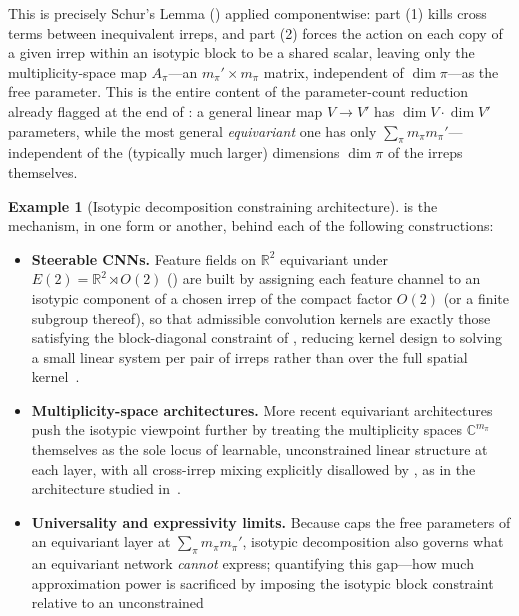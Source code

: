 \documentclass[11pt]{article}
\theoremstyle{plain}
\theoremstyle{definition}
\newtheorem{Example}{Example}[section]
\begin{document}
This is precisely Schur's Lemma () applied
componentwise: part (1) kills cross terms between inequivalent irreps, and
part (2) forces the action on each copy of a given irrep within an isotypic
block to be a shared scalar, leaving only the multiplicity-space map
$A_\pi$---an $m_\pi' \times m_\pi$ matrix, independent of $\dim \pi$---as the
free parameter. This is the entire content of the parameter-count reduction
already flagged at the end of : a general
linear map $V \to V'$ has $\dim V \cdot \dim V'$ parameters, while the most
general \emph{equivariant} one has only
$\sum_\pi m_\pi m_\pi'$---independent of the (typically much larger)
dimensions $\dim \pi$ of the irreps themselves.

\begin{Example}[Isotypic decomposition constraining architecture]
\label{ex:isotypic-architecture}
 is the mechanism, in one form or
another, behind each of the following constructions:
\begin{itemize}
    \item \textbf{Steerable CNNs.} Feature fields on $\mathbb{R}^2$
    equivariant under $E(2) = \mathbb{R}^2 \rtimes O(2)$
    () are built by assigning each
    feature channel to an isotypic component of a chosen irrep of the
    compact factor $O(2)$ (or a finite subgroup thereof), so that admissible
    convolution kernels are exactly those satisfying the block-diagonal
    constraint of , reducing kernel
    design to solving a small linear system per pair of irreps rather than
    over the full spatial kernel~\citep{weiler2019anips}.
    \item \textbf{Multiplicity-space architectures.} More recent
    equivariant architectures push the isotypic viewpoint further by
    treating the multiplicity spaces $\mathbb{C}^{m_\pi}$ themselves as the
    sole locus of learnable, unconstrained linear structure at each layer,
    with all cross-irrep mixing explicitly disallowed by
    , as in the architecture studied
    in~\citep{xu2022p3icml}.
    \item \textbf{Universality and expressivity limits.} Because
     caps the free parameters of an
    equivariant layer at $\sum_\pi m_\pi m_\pi'$, isotypic decomposition
    also governs what an equivariant network \emph{cannot} express;
    quantifying this gap---how much approximation power is sacrificed by
    imposing the isotypic block constraint relative to an unconstrained

\end{itemize}
\end{Example}
\end{document}
